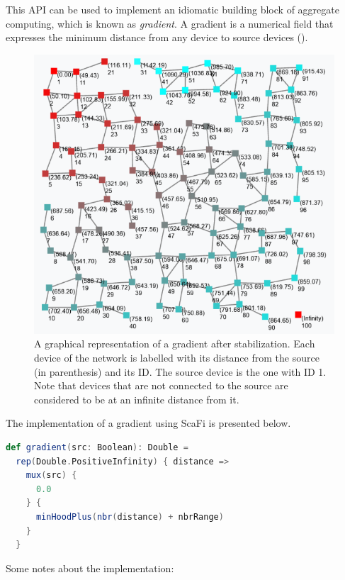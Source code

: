 This API can be used to implement an idiomatic building block of aggregate computing, which is known as \textit{gradient}.
%
A gradient is a numerical field that expresses the minimum distance from any device to source devices ().
%
\begin{figure}
    \centering
    \includegraphics[width=\textwidth]{figures/gradient-example.png}
    \caption
    {
        A graphical representation of a gradient after stabilization.
        Each device of the network is labelled with its distance from the source (in parenthesis) and its ID.
        The source device is the one with ID 1.
        Note that devices that are not connected to the source are considered to be at an infinite distance from it.
    }
    \label{fig:gradient}
\end{figure}
%
The implementation of a gradient using ScaFi is presented below.
%
\begin{lstlisting}[frame=single, language=scala]
def gradient(src: Boolean): Double =
  rep(Double.PositiveInfinity) { distance =>
    mux(src) {
      0.0
    } {
      minHoodPlus(nbr(distance) + nbrRange)
    }
  }
\end{lstlisting}
%
Some notes about the implementation:
%
